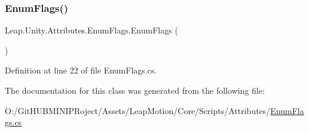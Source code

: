 \subsubsection{\texorpdfstring{EnumFlags()}{EnumFlags()}}
{\footnotesize\ttfamily Leap.\+Unity.\+Attributes.\+Enum\+Flags.\+Enum\+Flags (\begin{DoxyParamCaption}{ }\end{DoxyParamCaption})}



Definition at line 22 of file Enum\+Flags.\+cs.



The documentation for this class was generated from the following file\+:\begin{DoxyCompactItemize}
\item 
O\+:/\+Git\+H\+U\+B\+M\+I\+N\+I\+P\+Roject/\+Assets/\+Leap\+Motion/\+Core/\+Scripts/\+Attributes/\mbox{\hyperlink{_leap_motion_2_core_2_scripts_2_attributes_2_enum_flags_8cs}{Enum\+Flags.\+cs}}\end{DoxyCompactItemize}
